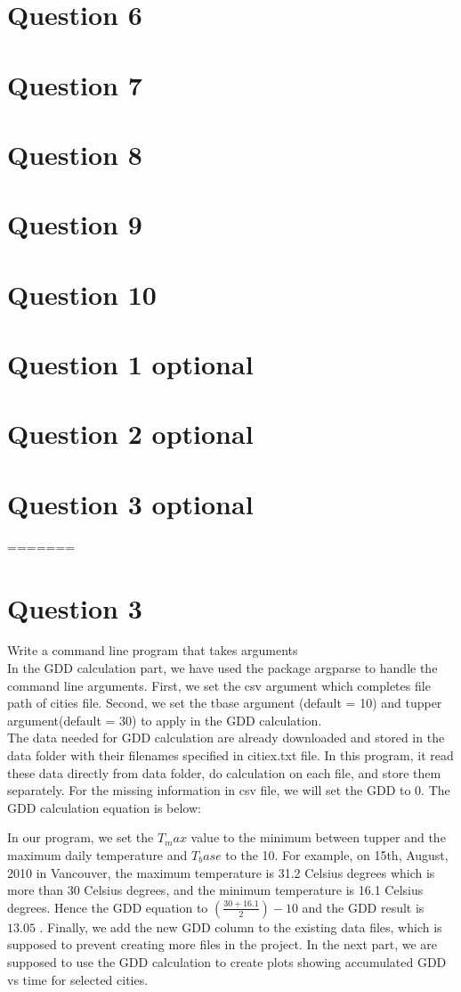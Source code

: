 \documentclass[12pt,letterpaper]{article}
\begin{document}
\section{Question 6}
\section{Question 7}
\section{Question 8}
\section{Question 9}
\section{Question 10}
\section{Question 1 optional}
\section{Question 2 optional}
\section{Question 3 optional}
=======
\section{Question 3}
Write a command line program that takes arguments\\
In the GDD calculation part, we have used the package argparse to handle the command line arguments. First, we set the csv argument which completes file path of cities file. Second, we set the tbase argument (default = 10) and tupper argument(default = 30) to apply in the GDD calculation.\\
The data needed for GDD calculation are already downloaded and stored in the data folder with their filenames specified in citiex.txt file. In this program, it read these data directly from data folder, do calculation on each file, and store them separately. For the missing information in csv file, we will set the GDD to 0. The GDD calculation equation is below:

In our program, we set the $ T_max$ value to the minimum between tupper and the maximum daily temperature and $ T_base$ to the 10. For example, on 15th, August, 2010 in Vancouver, the maximum temperature is 31.2 Celsius degrees which is more than 30 Celsius degrees, and the minimum temperature is 16.1 Celsius degrees. Hence the GDD equation to $(\frac{30+16.1}{2})-10$  
and the GDD result is $13.05$ .
Finally, we add the new GDD column to the existing data files, which is supposed to prevent creating more files in the project.
In the next part, we are supposed to use the GDD calculation to create plots showing accumulated GDD vs time for selected cities.
\end{document}

